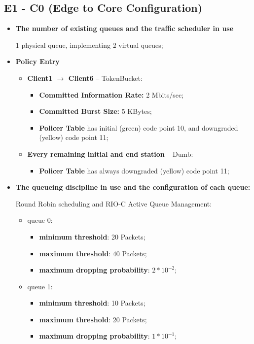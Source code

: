 \documentclass[conference,compsoc]{IEEEtran}
\begin{document}
     \subsection{E1 - C0 (Edge to Core Configuration)}
     \begin{itemize}
     \item \textbf{The number of existing queues and the traffic scheduler in use} \par 
     1 physical queue,  implementing 2 virtual queues;  
     \vspace{5mm}
     \item \textbf{Policy Entry}
     \begin{itemize}
     \item \textbf{Client1 $\rightarrow$ Client6} -- TokenBucket:
     \begin{itemize}
     \item \textbf{Committed Information Rate:} 2 Mbits/sec;
     \item \textbf{Committed Burst Size:} 5 KBytes;
     \item \textbf{Policer Table} has initial (green) code point 10, and downgraded (yellow) code point 11;
     \end{itemize}
     \item \textbf{Every remaining initial and end station} -- Dumb:
     \begin{itemize}
     \item \textbf{Policer Table} has always downgraded (yellow) code point 11;
     \end{itemize}
     \end{itemize}

     \vspace{5mm}
     \item \textbf{The queueing discipline in use and the configuration of each queue:}\par
     Round Robin scheduling and RIO-C Active Queue Management: \par 
     \begin{itemize}
     \item queue 0:
     \begin{itemize}
     \item \textbf{minimum threshold}: 20 Packets;
     \item \textbf{maximum threshold}: 40 Packets;
     \item \textbf{maximum dropping probability}: $2 * 10^{-2}$;
     \end{itemize}
     \item queue 1:
     \begin{itemize}
     \item \textbf{minimum threshold}: 10 Packets;
     \item \textbf{maximum threshold}: 20 Packets;
     \item \textbf{maximum dropping probability}:  $1 * 10^{-1}$;
     \end{itemize}
     \end{itemize}


\end{itemize}
\end{document}
